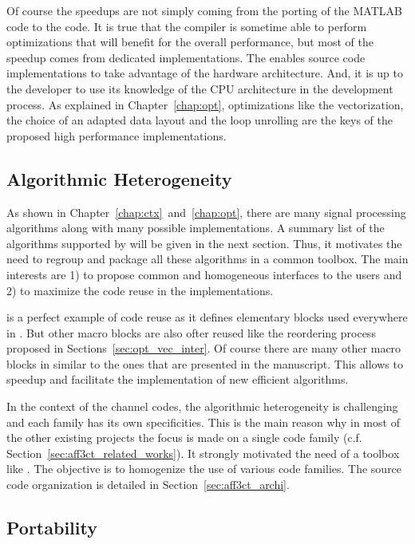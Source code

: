 Of course the speedups are not simply coming from the porting of the MATLAB
code to the \Cxx code. It is true that the compiler is sometime able to perform
optimizations that will benefit for the overall performance, but most of the
speedup comes from dedicated implementations. The \Cxx enables source code
implementations to take advantage of the hardware architecture. And, it is up
to the developer to use its knowledge of the CPU architecture in the development
process. As explained in Chapter~\ref{chap:opt}, optimizations like the
vectorization, the choice of an adapted data layout and the loop unrolling are
the keys of the proposed high performance implementations.

\subsection{Algorithmic Heterogeneity}

As shown in Chapter~\ref{chap:ctx}~and~\ref{chap:opt}, there are many signal
processing algorithms along with many possible implementations. A summary list
of the algorithms supported by \AFFECT will be given in the next section. Thus,
it motivates the need to regroup and package all these algorithms in a common
toolbox. The main interests are 1) to propose common and homogeneous interfaces
to the users and 2) to maximize the code reuse in the implementations.

\MIPP is a perfect example of code reuse as it defines elementary blocks used
everywhere in \AFFECT. But other macro blocks are also ofter reused like the
reordering process proposed in Sections~\ref{sec:opt_vec_inter}. Of course there
are many other macro blocks in \AFFECT similar to the ones that are presented in
the manuscript. This allows to speedup and facilitate the implementation of new
efficient algorithms.

In the context of the channel codes, the algorithmic heterogeneity is
challenging and each family has its own specificities. This is the main reason
why in most of the other existing projects the focus is made on a single code
family (c.f. Section~\ref{sec:aff3ct_related_works}). It strongly motivated
the need of a toolbox like \AFFECT. The objective is to homogenize the use of
various code families. The \AFFECT source code organization is detailed in
Section~\ref{sec:aff3ct_archi}.

\subsection{Portability}

